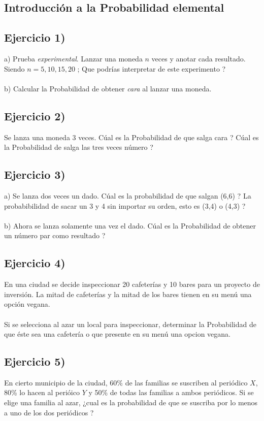 \documentclass[11pt, a4paper]{article}
\begin{document}
\subsection{ Introducci\'on a la Probabilidad elemental}
\subsection*{Ejercicio 1) } a) Prueba \textit{experimental}. Lanzar una moneda $n$ veces y anotar cada resultado. Siendo $n = 5,10,15,20 $ ; Que podr\'ias interpretar de este experimento ? \\ \\
b) Calcular la Probabilidad de obtener \textit{cara} al lanzar una moneda. 

\subsection*{Ejercicio 2)}
Se lanza una moneda 3 veces. C\'ual es la Probabilidad de que salga cara ? C\'ual es la Probabilidad de salga las tres veces n\'umero ? 
\subsection*{Ejercicio 3)}
a) Se lanza dos veces un dado. C\'ual es la probabilidad de que salgan (6,6) ? La probabibilidad de sacar un 3 y 4 sin importar su orden, esto es (3,4) o (4,3) ? \\ \\
b) Ahora se lanza solamente una vez el dado. C\'ual es la Probabilidad de obtener un n\'umero par como resultado ?  
\subsection*{Ejercicio 4)}
En una ciudad se decide inspeccionar 20 cafeter\'ias y 10 bares para un proyecto de inversi\'on. La mitad de cafeter\'ias y la mitad de los bares tienen en su men\'u una opci\'on vegana. \\ \\
Si se selecciona al azar un local para inspeccionar, determinar la Probabilidad de que \'este sea una cafeter\'ia o que presente en su men\'u una opcion vegana. 

\subsection*{Ejercicio 5)}
En cierto municipio de la ciudad, 60\% de las familias se suscriben al peri\'odico $X$, 80\% lo hacen al peri\'oico $Y$ y 50\% de todas las familias a ambos peri\'odicos. Si se elige una familia al azar, ¿cual es la probabilidad de que se suscriba por lo menos a
uno de los dos peri\'odicos ?  
\end{document}
